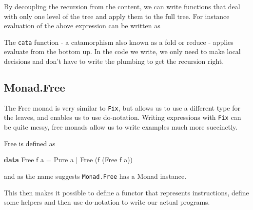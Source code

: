 \documentclass[runningheads,plain]{llncs}
\newenvironment{Shaded}{}{}
\newcommand{\KeywordTok}[1]{\textcolor[rgb]{0.00,0.44,0.13}{\textbf{#1}}}
\newcommand{\DataTypeTok}[1]{\textcolor[rgb]{0.56,0.13,0.00}{#1}}
\newcommand{\OtherTok}[1]{\textcolor[rgb]{0.00,0.44,0.13}{#1}}
\newcommand{\FunctionTok}[1]{\textcolor[rgb]{0.02,0.16,0.49}{#1}}
\newcommand{\NormalTok}[1]{#1}
\begin{document}
By decoupling the recursion from the content, we can write functions
that deal with only one level of the tree and apply them to the full
tree. For instance evaluation of the above expression can be written as

\begin{Shaded}
\end{Shaded}

The \texttt{cata} function - a catamorphism also known as a fold or
reduce - applies evaluate from the bottom up. In the code we write, we
only need to make local decisions and don't have to write the plumbing
to get the recursion right.

\subsection{Monad.Free}\label{free-monad}

The Free monad is very similar to \texttt{Fix}, but allows us to use a
different type for the leaves, and enables us to use do-notation.
Writing expressions with \texttt{Fix} can be quite messy, free monads
allow us to write examples much more succinctly.

Free is defined as

\begin{Shaded}
\begin{Highlighting}[]
\KeywordTok{data} \DataTypeTok{Free}\NormalTok{ f a}
    \FunctionTok{=} \DataTypeTok{Pure}\NormalTok{ a }
    \FunctionTok{|} \DataTypeTok{Free}\NormalTok{ (f (}\DataTypeTok{Free}\NormalTok{ f a))}
\end{Highlighting}
\end{Shaded}

and as the name suggests \texttt{Monad.Free} has a Monad instance.

This then makes it possible to define a functor that represents
instructions, define some helpers and then use do-notation to write our
actual programs.
\end{document}
